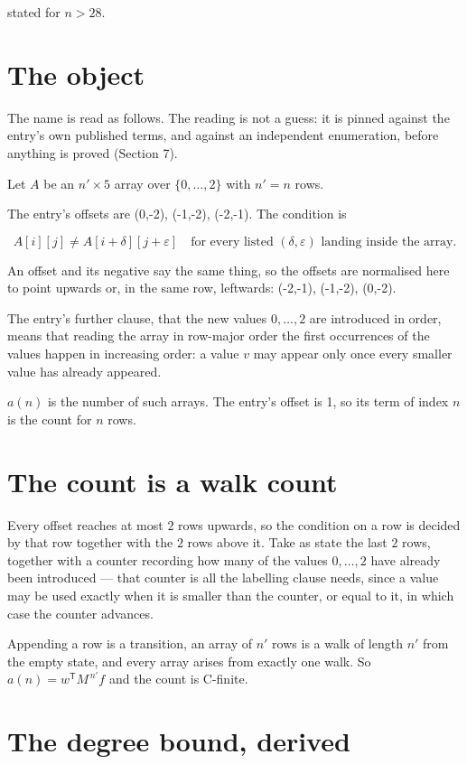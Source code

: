\documentclass[11pt]{article}
\theoremstyle{definition}
\begin{document}
stated for $n > 28$.

\section{The object}

The name is read as follows. The reading is not a guess: it is pinned against the entry's own published terms, and against an independent enumeration, before anything is proved (Section 7).

Let $A$ be an $n' \times 5$ array over $\{0,\dots,2\}$ with $n' = n$ rows.

The entry's offsets are (0,-2), (-1,-2), (-2,-1). The condition is

\[A[i][j] \ne A[i{+}\delta][j{+}\varepsilon]\quad\text{for every listed }(\delta,\varepsilon)\text{ landing inside the array.}\]

An offset and its negative say the same thing, so the offsets are normalised here to point upwards or, in the same row, leftwards: (-2,-1), (-1,-2), (0,-2).

The entry's further clause, that the new values $0,\dots,2$ are introduced in order, means that reading the array in row-major order the first occurrences of the values happen in increasing order: a value $v$ may appear only once every smaller value has already appeared.

$a(n)$ is the number of such arrays. The entry's offset is 1, so its term of index $n$ is the count for $n$ rows.

\section{The count is a walk count}

Every offset reaches at most $2$ rows upwards, so the condition on a row is decided by that row together with the $2$ rows above it. Take as state the last $2$ rows, together with a counter recording how many of the values $0,\dots,2$ have already been introduced --- that counter is all the labelling clause needs, since a value may be used exactly when it is smaller than the counter, or equal to it, in which case the counter advances.

Appending a row is a transition, an array of $n'$ rows is a walk of length $n'$ from the empty state, and every array arises from exactly one walk. So $a(n) = w^{\mathsf T}M^{\,n'}f$ and the count is C-finite.

\section{The degree bound, derived}
\end{document}
